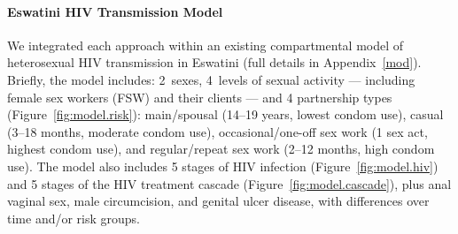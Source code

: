 \paragraph{Eswatini HIV Transmission Model}
We integrated each approach within an existing compartmental model
of heterosexual HIV transmission in Eswatini \cite{Knight2024art}
(full details in Appendix~\ref{mod}).
Briefly, the model includes: 2~sexes, 4~levels of sexual activity
--- including female sex workers (FSW) and their clients ---
and 4 partnership types (Figure~\ref{fig:model.risk}): %
main/spousal (14--19 years, lowest condom use),
casual (3--18 months, moderate condom use),
occasional/one-off sex work (1 sex act, highest condom use), and
regular/repeat sex work (2--12 months, high condom use).
The model also includes
5 stages of HIV infection (Figure~\ref{fig:model.hiv}) and
5 stages of the HIV treatment cascade (Figure~\ref{fig:model.cascade}), plus
anal \vs vaginal sex, male circumcision, and genital ulcer disease,
with differences over time and/or risk groups.
